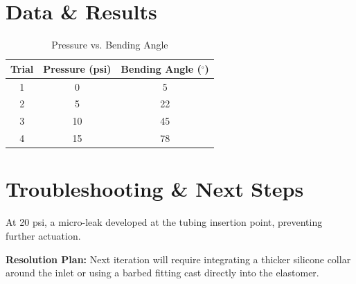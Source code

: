 \documentclass[11pt, letterpaper]{article}
\begin{document}
\section{Data \& Results}
\begin{table}[h]
    \centering
    \caption{Pressure vs. Bending Angle}
    \vspace{0.2cm}
    \begin{tabular}{@{} c c c @{}}
        \toprule
        \textbf{Trial} & \textbf{Pressure (psi)} & \textbf{Bending Angle ($^\circ$)} \\
        \midrule
        1 & 0 & 5 \\
        2 & 5 & 22 \\
        3 & 10 & 45 \\
        4 & 15 & 78 \\
        \bottomrule
    \end{tabular}
    \label{tab:data}
\end{table}

\section{Troubleshooting \& Next Steps}
\begin{tcolorbox}[colback=red!5!white,colframe=red!75!black,title=Issue Encountered]
At 20 psi, a micro-leak developed at the tubing insertion point, preventing further actuation.
\end{tcolorbox}
\textbf{Resolution Plan:} Next iteration will require integrating a thicker silicone collar around the inlet or using a barbed fitting cast directly into the elastomer.
\end{document}
